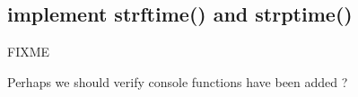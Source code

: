 
\begin{DoxyRefList}
\item[\label{todo__todo000001}%
\hypertarget{todo__todo000001}{}%
Global \hyperlink{time_8h_a7ffc52def0c7fbf70c50248e3f7d6a8a}{asctime\+\_\+r} (tm\+\_\+t $\ast$t, char $\ast$buf)]\section*{implement strftime() and strptime() }


\item[\label{todo__todo000002}%
\hypertarget{todo__todo000002}{}%
Global \hyperlink{fatfs__utils_8h_a97a2409a53057e1a63537f196ff00a50}{fatfs\+\_\+cat} (char $\ast$name)]F\+I\+X\+ME  
\item[\label{todo__todo000003}%
\hypertarget{todo__todo000003}{}%
Global \hyperlink{posix_8h_a31986cce890109c211ccb14151aafd0e}{isatty} (int fileno)]Perhaps we should verify console functions have been added ? 
\end{DoxyRefList}